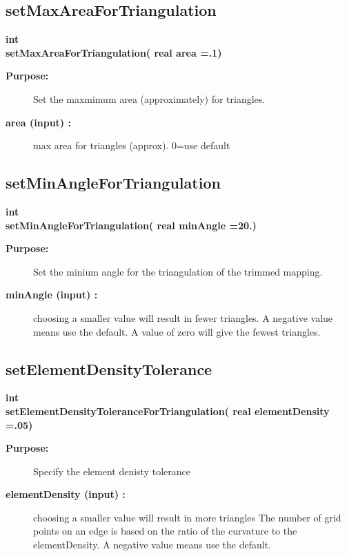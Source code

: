 \subsection{setMaxAreaForTriangulation}
 
\begin{flushleft} \textbf{%
int  \\ 
\settowidth{\TrimmedMappingIncludeArgIndent}{setMaxAreaForTriangulation(}%
setMaxAreaForTriangulation( real area  =.1)
}\end{flushleft}
\begin{description}
\item[{\bf Purpose:}]  
    Set the maxmimum area (approximately) for triangles.
\item[{\bf area (input) :}]  max area for triangles (approx). 0=use default
\end{description}
\subsection{setMinAngleForTriangulation}
 
\begin{flushleft} \textbf{%
int  \\ 
\settowidth{\TrimmedMappingIncludeArgIndent}{setMinAngleForTriangulation(}%
setMinAngleForTriangulation( real minAngle  =20.)
}\end{flushleft}
\begin{description}
\item[{\bf Purpose:}]  
    Set the minium angle for the triangulation of the trimmed mapping.
\item[{\bf minAngle (input) :}]  choosing a smaller value will result in fewer triangles.
            A negative value means use the default. A value of zero will give the
           fewest triangles.
\end{description}
\subsection{setElementDensityTolerance}
 
\begin{flushleft} \textbf{%
int  \\ 
\settowidth{\TrimmedMappingIncludeArgIndent}{setElementDensityToleranceForTriangulation(}%
setElementDensityToleranceForTriangulation( real elementDensity  =.05)
}\end{flushleft}
\begin{description}
\item[{\bf Purpose:}]  
    Specify the element denisty tolerance
\item[{\bf elementDensity (input) :}]  choosing a smaller value will result in more triangles
    The number of grid points on an edge is based on the ratio of the curvature to the 
         elementDensity. A negative value means use the default. 
\end{description}
